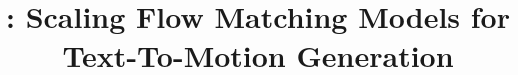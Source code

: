 \documentclass{article}
\title{
\modelname{}: Scaling Flow Matching Models for Text-To-Motion Generation
}
\author{
    \textbf{\teamname{}}
}
\begin{document}
\maketitle












\clearpage

{\small


}
\end{document}
